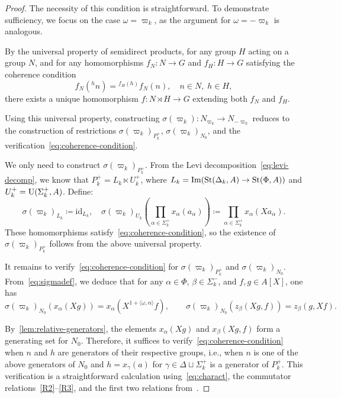 \begin{proof}
    The necessity of this condition is straightforward.
    To demonstrate sufficiency, we focus on the case $\omega = \varpi_k$, as the argument for $\omega = -\varpi_k$ is analogous.

    By the universal property of semidirect products, for any group $H$ acting on a group $N$, and for any homomorphisms $f_N\colon N \to G$ and $f_H\colon H \to G$ satisfying the coherence condition
    \begin{equation}
        \label{eq:coherence-condition}
        f_N({}^hn) = {}^{f_H(h)} f_N(n), \quad n \in N, \; h \in H,
    \end{equation}
    there exists a unique homomorphism $f\colon N \rtimes H \to G$ extending both $f_N$ and $f_H$.

    Using this universal property, constructing \( \sigma(\varpi_k) \colon N_{\varpi_k} \to N_{-\varpi_k} \) reduces to the construction of
     restrictions \( \sigma(\varpi_k)_{P_k^+} \), \( \sigma(\varpi_k)_{N_0} \), and the verification~\eqref{eq:coherence-condition}.

    We only need to construct \( \sigma(\varpi_k)_{P_k^+} \).
    From the Levi decomposition~\eqref{eq:levi-decomp}, we know that \( P_k^+ = L_k \ltimes U_k^+ \), where \( L_k = \mathrm{Im}(\operatorname{St}(\Delta_k, A) \to \operatorname{St}(\Phi, A)) \) and
     \( U_k^+ = \operatorname{U}(\Sigma_k^+, A) \).
    Define:
    \begin{equation} \label{eq:sigma-Pk}
    \sigma(\varpi_k)_{L_k} \coloneqq \mathrm{id}_{L_k}, \quad
    \sigma(\varpi_k)_{U_k} \left(\prod_{\alpha \in \Sigma_k^+} x_\alpha(a_\alpha)\right) \coloneqq \prod_{\alpha \in \Sigma_k^+} x_\alpha(Xa_\alpha).
    \end{equation}
    These homomorphisms satisfy~\eqref{eq:coherence-condition}, so the existence of \( \sigma(\varpi_k)_{P_k^+} \) follows from the above universal property.

    It remains to verify~\eqref{eq:coherence-condition} for \( \sigma(\varpi_k)_{P_k^+} \) and \( \sigma(\varpi_k)_{N_0} \).
    From~\eqref{eq:sigmadef}, we deduce that for any \( \alpha \in \Phi \), \( \beta \in \Sigma_k^- \), and \( f, g \in A[X] \), one has
    \begin{equation} \label{eq:charact}
    \sigma(\varpi_k)_{N_0}(x_\alpha(Xg)) = x_\alpha(X^{1 + \langle \omega, \alpha \rangle}f), \qquad
    \sigma(\varpi_k)_{N_0}(z_\beta(Xg, f)) = z_\beta(g, Xf).
    \end{equation}

    By~\cref{lem:relative-generators}, the elements $x_\alpha(Xg)$ and $x_\beta(Xg, f)$ form a generating set for \( N_0 \).
    Therefore, it suffices to verify~\eqref{eq:coherence-condition} when \( n \) and \( h \) are generators of their respective groups,
     i.e., when \( n \) is one of the above generators of \( N_0 \) and \( h = x_\gamma(a) \) for \( \gamma \in \Delta \sqcup \Sigma^+_k \) is a generator of \( P_k^+ \).
    This verification is a straightforward calculation using~\eqref{eq:charact}, the commutator relations~\eqref{R2}--\eqref{R3}, and the first two relations from~\cite[Lemma~9]{S15}.
\end{proof}

